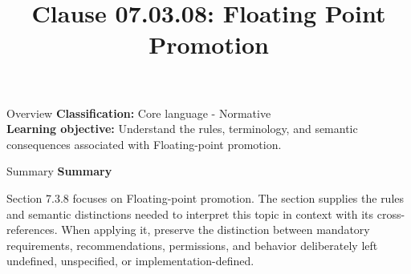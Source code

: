 \documentclass[10pt,letterpaper]{article}
\title{Clause 07.03.08: Floating Point Promotion}
\author{}
\date{}
\begin{document}
\maketitle
\begin{CornellOverviewBox}{Overview}
\textbf{Classification:} Core language - Normative\\[2pt]
\textbf{Learning objective:} Understand the rules, terminology, and semantic consequences associated with Floating-point promotion.
\end{CornellOverviewBox}\begin{CornellSummaryBox}{Summary}
{\sffamily\bfseries\color{Accent} Summary}\par\vspace{3pt}Section 7.3.8 focuses on Floating-point promotion. The section supplies the rules and semantic distinctions needed to interpret this topic in context with its cross-references. When applying it, preserve the distinction between mandatory requirements, recommendations, permissions, and behavior deliberately left undefined, unspecified, or implementation-defined.
\end{CornellSummaryBox}
\end{document}
